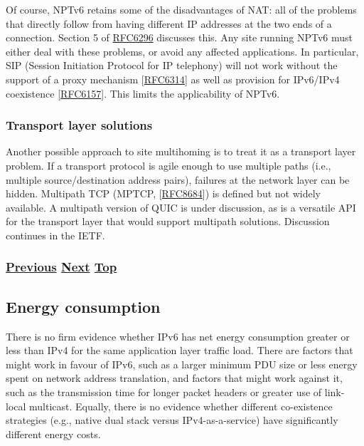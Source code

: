 \documentclass[
]{article}
\begin{document}
Of course, NPTv6 retains some of the disadvantages of NAT: all of the
problems that directly follow from having different IP addresses at the
two ends of a connection. Section 5 of
\href{https://www.rfc-editor.org/info/rfc6296}{RFC6296} discusses this.
Any site running NPTv6 must either deal with these problems, or avoid
any affected applications. In particular, SIP (Session Initiation
Protocol for IP telephony) will not work without the support of a proxy
mechanism {[}\href{https://www.rfc-editor.org/info/rfc6314}{RFC6314}{]}
as well as provision for IPv6/IPv4 coexistence
{[}\href{https://www.rfc-editor.org/info/rfc6157}{RFC6157}{]}. This
limits the applicability of NPTv6.

\subsubsection{Transport layer
solutions}\label{transport-layer-solutions}

Another possible approach to site multihoming is to treat it as a
transport layer problem. If a transport protocol is agile enough to use
multiple paths (i.e., multiple source/destination address pairs),
failures at the network layer can be hidden. Multipath TCP (MPTCP,
{[}\href{https://www.rfc-editor.org/info/rfc8684}{RFC8684}{]}) is
defined but not widely available. A multipath version of QUIC is under
discussion, as is a versatile API for the transport layer that would
support multipath solutions. Discussion continues in the IETF.

\subsubsection{\texorpdfstring{\hyperref[multi-prefix-operation]{Previous}
\hyperref[energy-consumption]{Next}
\hyperref[management-and-operations]{Top}}{Previous Next Top}}\label{previous-next-top-26}

\pagebreak

\subsection{Energy consumption}\label{energy-consumption}

There is no firm evidence whether IPv6 has net energy consumption
greater or less than IPv4 for the same application layer traffic load.
There are factors that might work in favour of IPv6, such as a larger
minimum PDU size or less energy spent on network address translation,
and factors that might work against it, such as the transmission time
for longer packet headers or greater use of link-local multicast.
Equally, there is no evidence whether different co-existence strategies
(e.g., native dual stack versus IPv4-as-a-service) have significantly
different energy costs.
\end{document}
